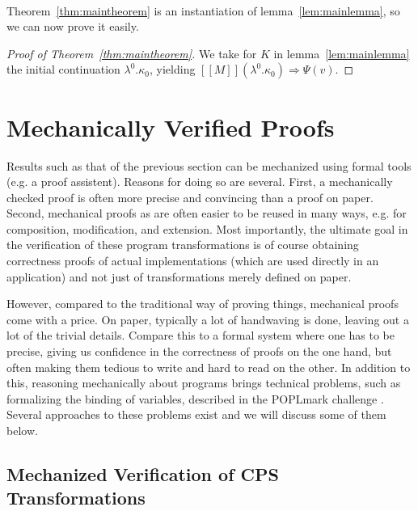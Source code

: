 \documentclass[a4paper,11pt,draft]{article}
\begin{document}
\paragraph{}

Theorem~\ref{thm:maintheorem} is an instantiation of
lemma~\ref{lem:mainlemma}, so we can now prove it easily.

\begin{proof}[Proof of Theorem~\ref{thm:maintheorem}]
We take for $K$ in lemma~\ref{lem:mainlemma} the initial continuation
$\lambda^{0}.\kappa_{0}$, yielding
$[\![M]\!] (\lambda^{0}.\kappa_{0}) \Rightarrow \Psi(v)$.
\end{proof}


\section{Mechanically Verified Proofs}\label{sec:mechanized}

Results such as that of the previous section can be mechanized using formal
tools (e.g. a proof assistent).
Reasons for doing so are several.
First, a mechanically checked proof is often more precise and convincing than
a proof on paper.
Second, mechanical proofs as are often easier to be reused in many ways, e.g.
for composition, modification, and extension.
Most importantly, the ultimate goal in the verification of these program
transformations is of course obtaining correctness proofs of actual
implementations (which are used directly in an application) and not just of
transformations merely defined on paper.

However, compared to the traditional way of proving things, mechanical proofs
come with a price.
On paper, typically a lot of handwaving is done, leaving out a lot of the
trivial details.
Compare this to a formal system where one has to be precise, giving us
confidence in the correctness of proofs on the one hand, but often making them
tedious to write and hard to read on the other.
In addition to this, reasoning mechanically about programs brings technical
problems, such as formalizing the binding of variables, described in the
POPLmark challenge \cite{Poplmark-Challenge-05}.
Several approaches to these problems exist and we will discuss some of them
below.

\subsection{Mechanized Verification of CPS Transformations}
\end{document}
